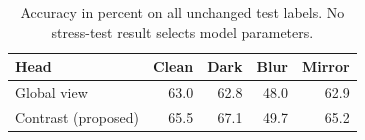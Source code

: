 \begin{table}[t]
\centering\small
\begin{tabular}{lrrrr}
\toprule
Head & Clean & Dark & Blur & Mirror \\
\midrule
Global view & 63.0 & 62.8 & 48.0 & 62.9 \\
Contrast (proposed) & 65.5 & 67.1 & 49.7 & 65.2 \\
\bottomrule
\end{tabular}
\caption{Accuracy in percent on all unchanged test labels. No stress-test result selects model parameters.}
\label{tab:image_stress}
\end{table}
